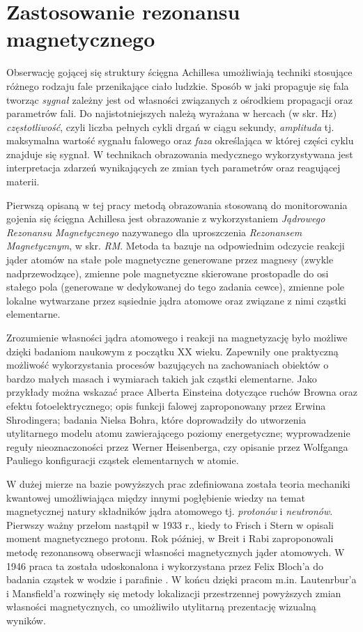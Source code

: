 \section{Zastosowanie rezonansu magnetycznego}
\label{RM}
Obserwację gojącej się struktury ścięgna Achillesa umożliwiają techniki stosujące różnego rodzaju fale przenikające ciało ludzkie. Sposób w jaki propaguje się fala tworząc \textit{sygnał} zależny jest od własności związanych z ośrodkiem propagacji oraz parametrów fali. Do najistotniejszych należą wyrażana w hercach (w skr. Hz) \textit{częstotliwość}, czyli liczba pełnych cykli drgań w ciągu sekundy, \textit{amplituda} tj. maksymalna wartość sygnału falowego oraz \textit{faza} określająca w której części cyklu znajduje się sygnał. W technikach obrazowania medycznego wykorzystywana jest interpretacja zdarzeń wynikających ze zmian tych parametrów oraz reagującej materii.

Pierwszą opisaną w tej pracy metodą obrazowania stosowaną do monitorowania gojenia się ścięgna Achillesa jest obrazowanie z wykorzystaniem \textit{Jądrowego Rezonansu Magnetycznego} nazywanego dla uproszczenia \textit{Rezonansem Magnetycznym}, w skr. \textit{RM}. Metoda ta bazuje na odpowiednim odczycie reakcji jąder atomów na stałe pole magnetyczne generowane przez magnesy (zwykle nadprzewodzące), zmienne pole magnetyczne skierowane prostopadle do osi stałego pola (generowane w dedykowanej do tego zadania cewce), zmienne pole lokalne wytwarzane przez sąsiednie jądra atomowe oraz związane z nimi cząstki elementarne.

Zrozumienie własności jądra atomowego i reakcji na magnetyzację było możliwe dzięki badaniom naukowym z początku XX wieku. Zapewniły one praktyczną możliwość wykorzystania procesów bazujących na zachowaniach obiektów o bardzo małych masach i wymiarach takich jak cząstki elementarne. Jako przykłady można wskazać prace Alberta Einsteina dotyczące ruchów Browna oraz efektu fotoelektrycznego; opis funkcji falowej zaproponowany przez Erwina Shrodingera; badania Nielsa Bohra, które doprowadziły do utworzenia utylitarnego modelu atomu zawierającego poziomy energetyczne; wyprowadzenie reguły nieoznaczoności przez Werner Heisenberga, czy opisanie przez Wolfganga Pauliego konfiguracji cząstek elementarnych w atomie. 

W dużej mierze na bazie powyższych prac zdefiniowana została teoria mechaniki kwantowej umożliwiająca między innymi pogłębienie wiedzy na temat magnetycznej natury składników jądra atomowego tj. \textit{protonów} i \textit{neutronów}. Pierwszy ważny przełom nastąpił w 1933 r., kiedy to Frisch i Stern w \cite{Frisch1933} opisali moment magnetycznego protonu. Rok później, w \cite{Breit1934} Breit i Rabi zaproponowali metodę rezonansową obserwacji własności magnetycznych jąder atomowych. W 1946 praca ta została udoskonalona i wykorzystana przez Felix Bloch'a do badania cząstek w wodzie i parafinie \cite{Bloch1946}. W końcu dzięki pracom m.in. Lautenrbur'a \cite{LAUTERBUR1973} i Mansfield'a \cite{Mansfield1977} rozwinęły się metody lokalizacji przestrzennej powyższych zmian własności magnetycznych, co umożliwiło utylitarną prezentację wizualną wyników. 

